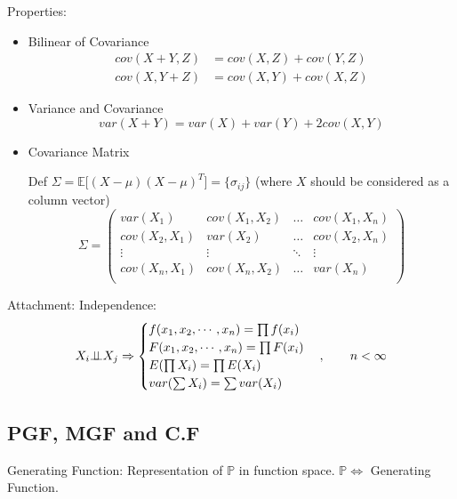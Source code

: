    Properties:
\begin{itemize}
\item Bilinear of Covariance\begin{align}
    cov(X+Y,Z)&=cov(X,Z)+cov(Y,Z)\\
    cov(X,Y+Z)&=cov(X,Y)+cov(X,Z)
\end{align}
    
\item Variance and Covariance
\begin{equation}\label{EqaVarOfSumOfRV}
    var(X+Y)=var(X)+var(Y)+2cov(X,Y)
\end{equation}
\item Covariance Matrix

    Def $\Sigma=\mathbb{E}\big[(X-\mu)(X-\mu)^T\big]=\{\sigma_{ij}\}$ (where $X$ should be considered as a column vector)
\begin{equation}\label{covariancematrix}
    \Sigma=
        \begin{pmatrix}
        var(X_1) & cov(X_1,X_2) & \ldots & cov(X_1,X_n)\\
        cov(X_2,X_1) & var(X_2) & \ldots & cov(X_2,X_n)\\
        \vdots & \vdots & \ddots & \vdots\\
        cov(X_n,X_1) & cov(X_n,X_2) & \ldots & var(X_n)\\
        \end{pmatrix}    
    \end{equation}
\end{itemize}

Attachment: Independence:\begin{equation}    X_i \bot\!\!\!\bot X_j\Rightarrow \begin{cases}
        f(x_1,x_2,\cdots,x_n)=\prod f(x_i)\\
        F(x_1,x_2,\cdots,x_n)=\prod F(x_i)\\
        E(\prod X_i)=\prod E(X_i)\\
        var(\sum X_i)=\sum var(X_i)
    \end{cases},\qquad n<\infty
\end{equation}


\subsection{PGF, MGF and C.F}\label{SectionPGFMGFCF}

    Generating Function: Representation of $\mathbb{P}$ in function space. $\mathbb{P}\Leftrightarrow$ Generating Function.

